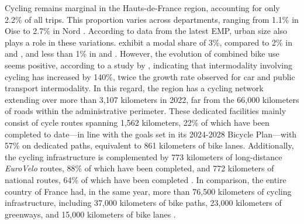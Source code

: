 \begin{refsegment}
Cycling remains marginal in the Hauts-de-France region, accounting for only 2.2\% of all trips. This proportion varies across departments, ranging from 1.1\% in Oise to 2.7\% in Nord \textcolor{blue}{\autocite{insee_documentation_2023}}. According to data from the latest \acrshort{EMP}, urban size also plays a role in these variations.  exhibit a modal share of 3\%, compared to 2\% in  and , and less than 1\% in  and  \textcolor{blue}{\autocite{velo__territoires_atlas_2023}}. However, the evolution of combined bike use seems positive, according to a study by \textcolor{blue}{\textcite[44]{region_hauts-de-france_planification_2024}}, indicating that intermodality involving cycling has increased by 140\%, twice the growth rate observed for car and public transport intermodality. In this regard, the region has a cycling network extending over more than 3,107 kilometers in 2022, far from the 66,000 kilometers of roads within the administrative perimeter. These dedicated facilities mainly consist of cycle routes spanning 1,562 kilometers, 22\% of which have been completed to date—in line with the goals set in its 2024-2028 Bicycle Plan—with 57\% on dedicated paths, equivalent to 861 kilometers of bike lanes. Additionally, the cycling infrastructure is complemented by 773 kilometers of long-distance \textsl{EuroVelo} routes, 88\% of which have been completed, and 772 kilometers of national routes, 64\% of which have been completed \textcolor{blue}{\autocite{velo__territoires_atlas_2023}}. In comparison, the entire country of France had, in the same year, more than 76,500 kilometers of cycling infrastructure, including 37,000 kilometers of bike paths, 23,000 kilometers of greenways, and 15,000 kilometers of bike lanes \textcolor{blue}{\autocite{geovelo_pistes_2024}}.%


\end{refsegment}
